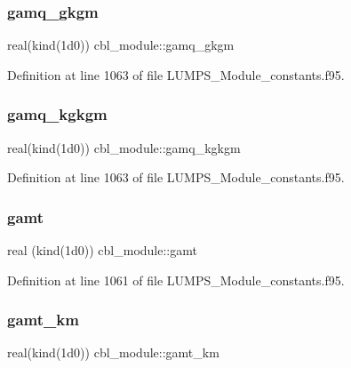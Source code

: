 \mbox{\label{namespacecbl__module_a6aab251dd8f51c9cd6a8dc723a99fdf3}} 
\subsubsection{\texorpdfstring{gamq\+\_\+gkgm}{gamq\_gkgm}}
{\footnotesize\ttfamily real(kind(1d0)) cbl\+\_\+module\+::gamq\+\_\+gkgm}



Definition at line 1063 of file L\+U\+M\+P\+S\+\_\+\+Module\+\_\+constants.\+f95.

\mbox{\label{namespacecbl__module_a1ce0de96513d92e7be4a7b0318a7102a}} 
\subsubsection{\texorpdfstring{gamq\+\_\+kgkgm}{gamq\_kgkgm}}
{\footnotesize\ttfamily real(kind(1d0)) cbl\+\_\+module\+::gamq\+\_\+kgkgm}



Definition at line 1063 of file L\+U\+M\+P\+S\+\_\+\+Module\+\_\+constants.\+f95.

\mbox{\label{namespacecbl__module_ab55715333b9dc4e5699d418ce9aa6eca}} 
\subsubsection{\texorpdfstring{gamt}{gamt}}
{\footnotesize\ttfamily real (kind(1d0)) cbl\+\_\+module\+::gamt}



Definition at line 1061 of file L\+U\+M\+P\+S\+\_\+\+Module\+\_\+constants.\+f95.

\mbox{\label{namespacecbl__module_a86a03f05040f82f59951951ed8feb92d}} 
\subsubsection{\texorpdfstring{gamt\+\_\+km}{gamt\_km}}
{\footnotesize\ttfamily real(kind(1d0)) cbl\+\_\+module\+::gamt\+\_\+km}




